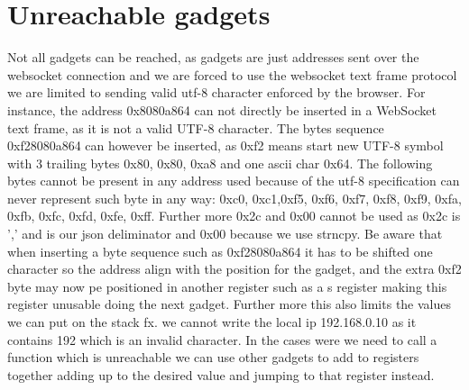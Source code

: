 \section{Unreachable gadgets}
Not all gadgets can be reached, as gadgets are just addresses sent over the websocket connection and we are forced to use the websocket text frame protocol we are limited to sending valid utf-8 character enforced by the browser.
For instance, the address 0x8080a864 can not directly be inserted in a WebSocket text frame, as it is not a valid UTF-8 character. The bytes sequence 0xf28080a864 can however be inserted, as 0xf2 means start new UTF-8 symbol with 3 trailing bytes 0x80, 0x80, 0xa8 and one ascii char 0x64. The following bytes cannot be present in any address used because of the utf-8 specification can never represent such byte in any way: 0xc0, 0xc1,0xf5, 0xf6, 0xf7, 0xf8, 0xf9, 0xfa, 0xfb, 0xfc, 0xfd, 0xfe, 0xff. Further more 0x2c and 0x00 cannot be used as 0x2c is ',' and is our json deliminator and 0x00 because we use strncpy. Be aware that when inserting a byte sequence such as 0xf28080a864 it has to be shifted one character so the address align with the position for the gadget, and the extra 0xf2 byte may now pe positioned in another register such as a s register making this register unusable doing the next gadget. Further more this also limits the values we can put on the stack fx. we cannot write the local ip 192.168.0.10 as it contains 192 which is an invalid character. In the cases were we need to call a function which is unreachable we can use other gadgets to add to registers together adding up to the desired value and jumping to that register instead.

